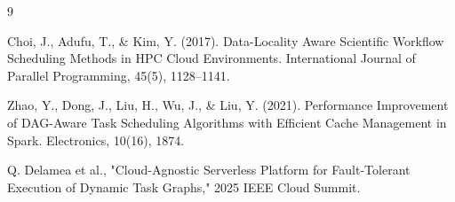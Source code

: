 \documentclass[12pt,a4paper]{report}
\begin{document}
\renewcommand{\bibname}{References}
\begin{thebibliography}{9}
Choi, J., Adufu, T., \& Kim, Y. (2017). Data-Locality Aware Scientific Workflow Scheduling Methods in HPC Cloud Environments. International Journal of Parallel Programming, 45(5), 1128–1141.

Zhao, Y., Dong, J., Liu, H., Wu, J., \& Liu, Y. (2021). Performance Improvement of DAG-Aware Task Scheduling Algorithms with Efficient Cache Management in Spark. Electronics, 10(16), 1874.

Q. Delamea et al., "Cloud-Agnostic Serverless Platform for Fault-Tolerant Execution of Dynamic Task Graphs," 2025 IEEE Cloud Summit.
\end{thebibliography}
\end{document}
